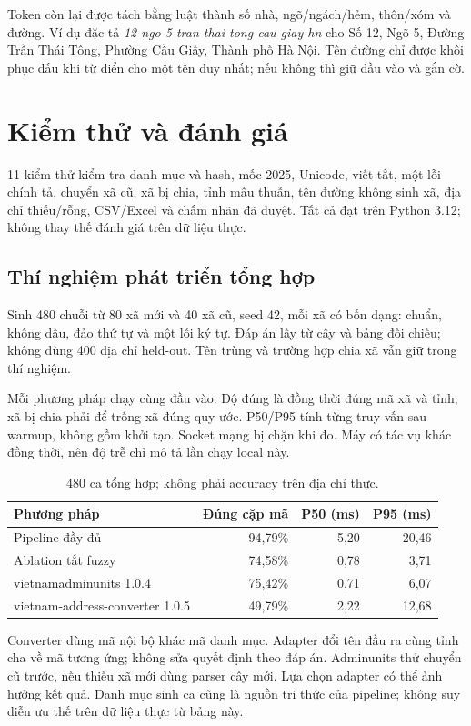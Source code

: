 \documentclass[12pt,a4paper]{article}
\begin{document}
Token còn lại được tách bằng luật thành số nhà, ngõ/ngách/hẻm, thôn/xóm và đường. Ví dụ đặc tả \emph{12 ngo 5 tran thai tong cau giay hn} cho Số 12, Ngõ 5, Đường Trần Thái Tông, Phường Cầu Giấy, Thành phố Hà Nội. Tên đường chỉ được khôi phục dấu khi từ điển cho một tên duy nhất; nếu không thì giữ đầu vào và gắn cờ.

\newpage
\section{Kiểm thử và đánh giá}
11 kiểm thử kiểm tra danh mục và hash, mốc 2025, Unicode, viết tắt, một lỗi chính tả, chuyển xã cũ, xã bị chia, tỉnh mâu thuẫn, tên đường không sinh xã, địa chỉ thiếu/rỗng, CSV/Excel và chấm nhãn đã duyệt. Tất cả đạt trên Python 3.12; không thay thế đánh giá trên dữ liệu thực.

\subsection{Thí nghiệm phát triển tổng hợp}
Sinh 480 chuỗi từ 80 xã mới và 40 xã cũ, seed 42, mỗi xã có bốn dạng: chuẩn, không dấu, đảo thứ tự và một lỗi ký tự. Đáp án lấy từ cây và bảng đối chiếu; không dùng 400 địa chỉ held-out. Tên trùng và trường hợp chia xã vẫn giữ trong thí nghiệm.

Mỗi phương pháp chạy cùng đầu vào. Độ đúng là đồng thời đúng mã xã và tỉnh; xã bị chia phải để trống xã đúng quy ước. P50/P95 tính từng truy vấn sau warmup, không gồm khởi tạo. Socket mạng bị chặn khi đo. Máy có tác vụ khác đồng thời, nên độ trễ chỉ mô tả lần chạy local này.
\begin{table}[htbp]\centering\small
\caption{480 ca tổng hợp; không phải accuracy trên địa chỉ thực.}
\begin{tabular}{@{}p{7cm}rrr@{}}\toprule
Phương pháp & Đúng cặp mã & P50 (ms) & P95 (ms)\\\midrule
Pipeline đầy đủ & 94,79\% & 5,20 & 20,46\\
Ablation tắt fuzzy & 74,58\% & 0,78 & 3,71\\
vietnamadminunits 1.0.4 & 75,42\% & 0,71 & 6,07\\
vietnam-address-converter 1.0.5 & 49,79\% & 2,22 & 12,68\\\bottomrule
\end{tabular}
\end{table}

Converter dùng mã nội bộ khác mã danh mục. Adapter đổi tên đầu ra cùng tỉnh cha về mã tương ứng; không sửa quyết định theo đáp án. Adminunits thử chuyển cũ trước, nếu thiếu xã mới dùng parser cây mới. Lựa chọn adapter có thể ảnh hưởng kết quả. Danh mục sinh ca cũng là nguồn tri thức của pipeline; không suy diễn ưu thế trên dữ liệu thực từ bảng này.
\end{document}
